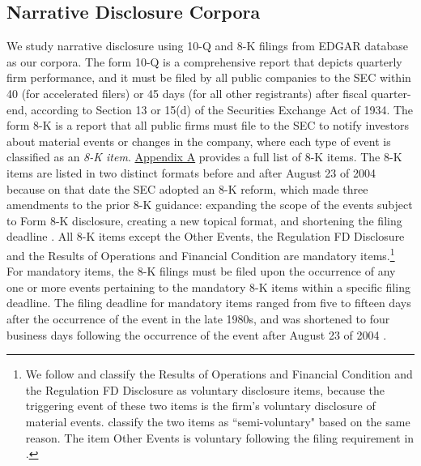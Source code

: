 \documentclass[letterpaper,11pt]{article}
\begin{document}
\begin{spacing}{1.5}
\subsection{Narrative Disclosure Corpora} \label{sec3.2}
We study narrative disclosure using 10-Q and 8-K filings from EDGAR database as our corpora. The form 10-Q is a comprehensive report that depicts quarterly firm performance, and it must be filed by all public companies to the SEC within 40 (for accelerated filers) or 45 days (for all other registrants) after fiscal quarter-end, according to Section 13 or 15(d) of the Securities Exchange Act of 1934. The form 8-K is a report that all public firms must file to the SEC to notify investors about material events or changes in the company, where each type of event is classified as an \textit{8-K item}. \hyperref[appa]{Appendix A} provides a full list of 8-K items. The 8-K items are listed in two distinct formats before and after August 23 of 2004 because on that date the SEC adopted an 8-K reform, which made three amendments to the prior 8-K guidance: expanding the scope of the events subject to Form 8-K disclosure, creating a new topical format, and shortening the filing deadline \cite{secFinalRuleAdditional2004, lermanNewForm8K2010}. All 8-K items except the Other Events, the Regulation FD Disclosure and the Results of Operations and Financial Condition are mandatory items.\footnote{We follow  and classify the Results of Operations and Financial Condition and the Regulation FD Disclosure as voluntary disclosure items, because the triggering event of these two items is the firm's voluntary disclosure of material events.  classify the two items as ``semi-voluntary" based on the same reason. The item Other Events is voluntary following the filing requirement in . } For mandatory items, the 8-K filings must be filed upon the occurrence of any one or more events pertaining to the mandatory 8-K items within a specific filing deadline. The filing deadline for mandatory items ranged from five to fifteen days after the occurrence of the event in the late 1980s, and was shortened to four business days following the occurrence of the event after August 23 of 2004 \cite{lermanNewForm8K2010}.


\end{spacing}
\end{document}
